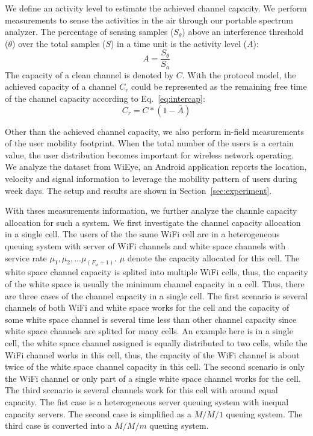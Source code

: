 We define an activity level to estimate the achieved channel capacity. 
We perform measurements to sense the activities in the air through our portable spectrum analyzer.
The percentage of sensing samples ($S_\theta$) above an interference threshold ($\theta$) over the 
total samples ($S$) in a time unit is the activity level ($A$):
\begin{equation}
\label{eq:actdef}
A=\frac{S_\theta}{S_a}
\end{equation}
The capacity of a clean channel is denoted by $C$. With the protocol model, the achieved capacity 
of a channel $C_r$ could be represented as the remaining free time of the channel capacity 
according to Eq.~\ref{eq:intercap}: 
\begin{equation}
\label{eq:intercap}
C_r=C*(1-\bar{A})
\end{equation}

Other than the achieved channel capacity, we also perform in-field measurements of the user mobility footprint. 
When the total number of the users is a certain value, the user distribution becomes important for wireless network 
operating. We analyze the dataset from WiEye, an Android application reports the location, velocity and signal 
information to leverage the mobility pattern of users during week days. The setup and results are shown in 
Section~\ref{sec:experiment}.

With thses measurements information, we further analyze the channle capacity allocation for such a system. 
We first investigate the channel capacity allocation in a single cell.
The users of the the same WiFi cell are in a heterogeneous queuing system with server of 
WiFi channels and white space channels with service rate $\mu_1,\mu_2,...\mu_{(F_w+1)}$.
$\mu$ denote the capacity allocated for this cell.
The white space channel capacity is splited into multiple WiFi cells, thus, the 
capacity of the white space is usually the minimum channel capacity in a cell.
Thus, there are three cases of the channel capacity in a single cell. 
The first scenario is several channels of both WiFi and white space works for the cell and the capacity of some 
white space channel is several time less than other channel capacity since white space channels are splited 
for many cells. 
An example here is in a single cell, the white space channel assigned is equally distributed to two cells, while 
the WiFi channel works in this cell, thus, the capacity of the WiFi channel is about twice of the white space 
channel capacity in this cell.
The second scenario is only the WiFi channel or only part of a single white space channel works 
for the cell. 
The third scenario is several channels work for this cell with around equal capacity.
The fist case is a heterogeneous server queuing system with inequal capacity servers.
The second case is simplified as a $M/M/1$ queuing system. 
The third case is converted into a $M/M/m$ queuing system.


